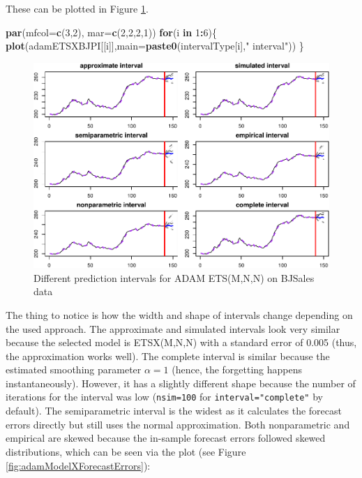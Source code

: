 \documentclass[]{book}
\newenvironment{Shaded}{\begin{snugshade}}{\end{snugshade}}
\newcommand{\ControlFlowTok}[1]{\textcolor[rgb]{0.13,0.29,0.53}{\textbf{#1}}}
\newcommand{\DataTypeTok}[1]{\textcolor[rgb]{0.13,0.29,0.53}{#1}}
\newcommand{\DecValTok}[1]{\textcolor[rgb]{0.00,0.00,0.81}{#1}}
\newcommand{\KeywordTok}[1]{\textcolor[rgb]{0.13,0.29,0.53}{\textbf{#1}}}
\newcommand{\NormalTok}[1]{#1}
\newcommand{\OperatorTok}[1]{\textcolor[rgb]{0.81,0.36,0.00}{\textbf{#1}}}
\newcommand{\StringTok}[1]{\textcolor[rgb]{0.31,0.60,0.02}{#1}}
\theoremstyle{definition}
\theoremstyle{definition}
\theoremstyle{definition}
\theoremstyle{definition}
\theoremstyle{remark}
\begin{document}
These can be plotted in Figure \ref{fig:adamModelXPI6Plots}.

\begin{Shaded}
\begin{Highlighting}[]
\KeywordTok{par}\NormalTok{(}\DataTypeTok{mfcol=}\KeywordTok{c}\NormalTok{(}\DecValTok{3}\NormalTok{,}\DecValTok{2}\NormalTok{), }\DataTypeTok{mar=}\KeywordTok{c}\NormalTok{(}\DecValTok{2}\NormalTok{,}\DecValTok{2}\NormalTok{,}\DecValTok{2}\NormalTok{,}\DecValTok{1}\NormalTok{))}
\ControlFlowTok{for}\NormalTok{(i }\ControlFlowTok{in} \DecValTok{1}\OperatorTok{:}\DecValTok{6}\NormalTok{)\{}
  \KeywordTok{plot}\NormalTok{(adamETSXBJPI[[i]],}\DataTypeTok{main=}\KeywordTok{paste0}\NormalTok{(intervalType[i],}\StringTok{" interval"}\NormalTok{))}
\NormalTok{\}}
\end{Highlighting}
\end{Shaded}

\begin{figure}
\centering
\includegraphics{Svetunkov--2022----ADAM_files/figure-latex/adamModelXPI6Plots-1.pdf}
\caption{\label{fig:adamModelXPI6Plots}Different prediction intervals for ADAM ETS(M,N,N) on BJSales data}
\end{figure}

The thing to notice is how the width and shape of intervals change depending on the used approach. The approximate and simulated intervals look very similar because the selected model is ETSX(M,N,N) with a standard error of 0.005 (thus, the approximation works well). The complete interval is similar because the estimated smoothing parameter \(\alpha=1\) (hence, the forgetting happens instantaneously). However, it has a slightly different shape because the number of iterations for the interval was low (\texttt{nsim=100} for \texttt{interval="complete"} by default). The semiparametric interval is the widest as it calculates the forecast errors directly but still uses the normal approximation. Both nonparametric and empirical are skewed because the in-sample forecast errors followed skewed distributions, which can be seen via the plot (see Figure \ref{fig:adamModelXForecastErrors}):
\end{document}
